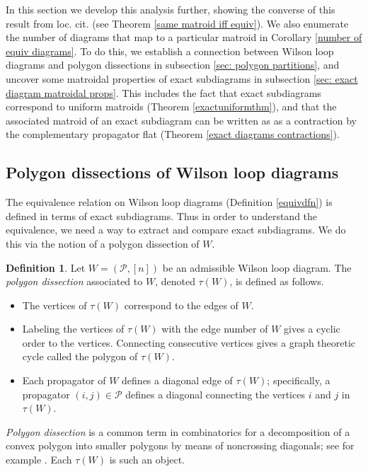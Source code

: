 \documentclass[11pt]{article}
\newcommand{\cP}{\mathcal{P}}
\theoremstyle{remark}
\theoremstyle{definition}
\newtheorem{dfn}[thm]{Definition}
\begin{document}
In this section we develop this analysis further, showing the converse of this result from loc. cit. (see Theorem \ref{same matroid iff equiv}). We also enumerate the number of diagrams that map to a particular matroid in Corollary \ref{number of equiv diagrams}. To do this, we establish a connection between Wilson loop diagrams and polygon dissections in subsection \ref{sec: polygon partitions}, and uncover some matroidal properties of exact subdiagrams in subsection \ref{sec: exact diagram matroidal props}. This includes the fact that exact subdiagrams correspond to uniform matroids (Theorem \ref{exactuniformthm}), and that the associated matroid of an exact subdiagram can be written as as a contraction by the complementary propagator flat (Theorem \ref{exact diagrams contractions}).


\subsection{Polygon dissections of Wilson loop diagrams\label{sec: polygon partitions}}


The equivalence relation on Wilson loop diagrams (Definition \ref{equivdfn}) is defined in terms of exact subdiagrams. Thus in order to understand the equivalence, we need a way to extract and compare exact subdiagrams. We do this via the notion of a polygon dissection of $W$.

\begin{dfn}\label{WLDtriangulationdfn}
  Let $W = (\cP, [n])$ be an admissible Wilson loop diagram.  The \emph{polygon dissection} associated to $W$, denoted $\tau(W)$, is defined as follows.
  \begin{itemize}
  \item The vertices of $\tau(W)$ correspond to the edges of $W$.
  \item Labeling the vertices of $\tau(W)$ with the edge number of $W$ gives a cyclic order to the vertices. Connecting consecutive vertices gives a graph theoretic cycle called the polygon of $\tau(W)$.
  \item Each propagator of $W$ defines a diagonal edge of $\tau(W)$; specifically,  a propagator $(i,j) \in \cP$ defines a diagonal connecting the vertices $i$ and $j$ in $\tau(W)$.
  \end{itemize}
\end{dfn}

\emph{Polygon dissection} is a common term in combinatorics for a decomposition of a convex polygon into smaller polygons by means of noncrossing diagonals; see for example \cite{PSpolygon}.  Each $\tau(W)$ is such an object.
\end{document}
